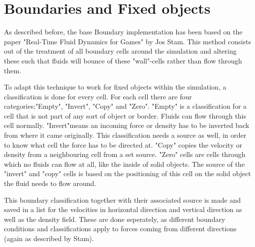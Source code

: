 \chapter{Boundaries and Fixed objects}
\label{chap:BoundariesAndFixedObjects}

As described before, the base Boundary implementation has been based on the paper "Real-Time Fluid Dynamics for Games" by Jos Stam. This method consists out of the treatment of all boundary cells around the simulation and altering these such that fluids will bounce of these "wall"-cells rather than flow through them.

To adapt this technique to work for fixed objects within the simulation, a classification is done for every cell. For each cell there are four categories;"Empty", "Invert", "Copy" and "Zero". "Empty" is a classification for a cell that is not part of any sort of object or border. Fluids can flow through this cell normally. "Invert"means an incoming force or density has to be inverted back from where it came originally. This classification needs a source as well, in order to know what cell the force has to be directed at. "Copy" copies the velocity or density from a neighbouring cell from a set source. "Zero" cells are cells through which no fluids can flow at all, like the inside of solid objects. The source of the "invert" and "copy" cells is based on the positioning of this cell on the solid object the fluid needs to flow around.

This boundary classification together with their associated source is made and saved in a list for the velocities in horizontal direction and vertical direction as well as the density field. These are done seperately, as different boundary conditions and classifications apply to forces coming from different directions (again as described by Stam).

